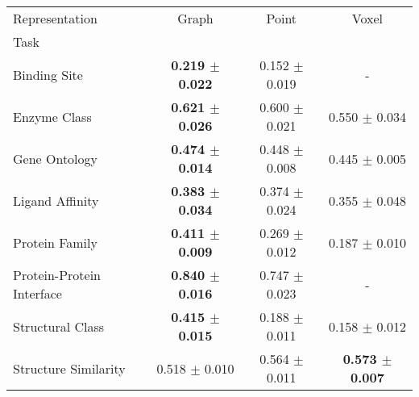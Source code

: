\begin{tabular}{lccc}
\toprule
Representation & Graph & Point & Voxel \\
Task &  &  &  \\
\midrule
Binding Site & \textbf{0.219 $\pm$ 0.022} & 0.152 $\pm$ 0.019 & - \\
Enzyme Class & \textbf{0.621 $\pm$ 0.026} & 0.600 $\pm$ 0.021 & 0.550 $\pm$ 0.034 \\
Gene Ontology & \textbf{0.474 $\pm$ 0.014} & 0.448 $\pm$ 0.008 & 0.445 $\pm$ 0.005 \\
Ligand Affinity & \textbf{0.383 $\pm$ 0.034} & 0.374 $\pm$ 0.024 & 0.355 $\pm$ 0.048 \\
Protein Family & \textbf{0.411 $\pm$ 0.009} & 0.269 $\pm$ 0.012 & 0.187 $\pm$ 0.010 \\
Protein-Protein Interface & \textbf{0.840 $\pm$ 0.016} & 0.747 $\pm$ 0.023 & - \\
Structural Class & \textbf{0.415 $\pm$ 0.015} & 0.188 $\pm$ 0.011 & 0.158 $\pm$ 0.012 \\
Structure Similarity & 0.518 $\pm$ 0.010 & 0.564 $\pm$ 0.011 & \textbf{0.573 $\pm$ 0.007} \\
\bottomrule
\end{tabular}
